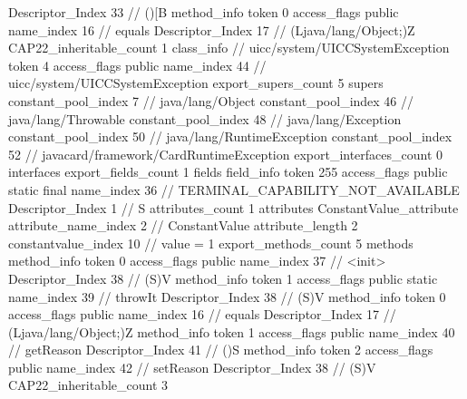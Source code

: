 {{{{{					Descriptor_Index	33		// ()[B
				}
				method_info {
					token	0
					access_flags	public
					name_index	16		// equals
					Descriptor_Index	17		// (Ljava/lang/Object;)Z
				}
			}
			CAP22_inheritable_count	1
		}
		class_info {		// uicc/system/UICCSystemException
			token	4
			access_flags	public
			name_index	44		// uicc/system/UICCSystemException
			export_supers_count	5
			supers {
				constant_pool_index	7		// java/lang/Object
				constant_pool_index	46		// java/lang/Throwable
				constant_pool_index	48		// java/lang/Exception
				constant_pool_index	50		// java/lang/RuntimeException
				constant_pool_index	52		// javacard/framework/CardRuntimeException
			}
			export_interfaces_count	0
			interfaces {
			}
			export_fields_count	1
			fields {
			field_info {
				token	255
				access_flags	public static final
				name_index	36		// TERMINAL_CAPABILITY_NOT_AVAILABLE
				Descriptor_Index	1		// S
				attributes_count	1
				attributes {
				ConstantValue_attribute {
					attribute_name_index	2		// ConstantValue
					attribute_length	2
					constantvalue_index	10		// value = 1
				}
				}
			}
			}
			export_methods_count	5
			methods {
				method_info {
					token	0
					access_flags	public
					name_index	37		// <init>
					Descriptor_Index	38		// (S)V
				}
				method_info {
					token	1
					access_flags	public static
					name_index	39		// throwIt
					Descriptor_Index	38		// (S)V
				}
				method_info {
					token	0
					access_flags	public
					name_index	16		// equals
					Descriptor_Index	17		// (Ljava/lang/Object;)Z
				}
				method_info {
					token	1
					access_flags	public
					name_index	40		// getReason
					Descriptor_Index	41		// ()S
				}
				method_info {
					token	2
					access_flags	public
					name_index	42		// setReason
					Descriptor_Index	38		// (S)V
				}
			}
			CAP22_inheritable_count	3
		}
	}
}
